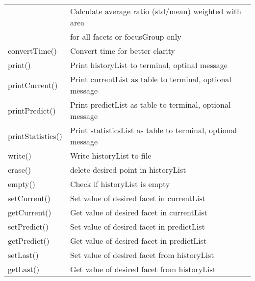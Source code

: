 \begin{center}
\begin{tabular}{|l|l|}
\rule{0pt}{3ex} \multirow{2}{*}{getAverageStatistics()}& Calculate average ratio (std/mean) weighted with area\\ & for all facets or focusGroup only\\
\rule{0pt}{3ex} convertTime()& Convert time for better clarity\\
\rule{0pt}{3ex} print()& Print historyList to terminal, optinal message\\
\rule{0pt}{3ex} printCurrent()& Print currentList as table to terminal, optional message\\
\rule{0pt}{3ex} printPredict()& Print predictList as table to terminal, optional message\\
\rule{0pt}{3ex} printStatistics()& Print statisticsList as table to terminal, optional message\\
\rule{0pt}{3ex} write()& Write historyList to file\\
\rule{0pt}{3ex} erase()& delete desired point in historyList\\
\rule{0pt}{3ex} empty()& Check if historyList is empty\\
\rule{0pt}{3ex} setCurrent()& Set value of desired facet in currentList\\
\rule{0pt}{3ex} getCurrent()& Get value of desired facet in currentList\\
\rule{0pt}{3ex} setPredict()& Set value of desired facet in predictList\\
\rule{0pt}{3ex} getPredict()& Get value of desired facet in predictList\\
\rule{0pt}{3ex} setLast()& Set value of desired facet from historyList\\
\rule{0pt}{3ex} getLast()& Get value of desired facet from historyList\\
\hline
\end{tabular}
\end{center}


